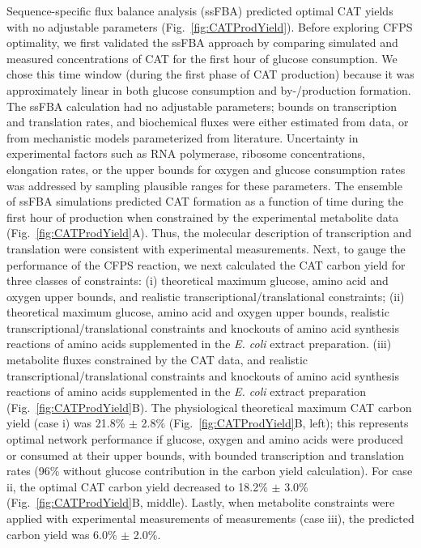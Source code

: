 \documentclass[12pt]{article}
\begin{document}
Sequence-specific flux balance analysis (ssFBA) predicted optimal CAT yields with no adjustable parameters (Fig.~\ref{fig:CATProdYield}).
Before exploring CFPS optimality, we first validated the ssFBA approach by comparing simulated and measured concentrations of CAT for the first hour of glucose consumption.
We chose this time window (during the first phase of CAT production) because it was approximately linear in both glucose consumption and by-/production formation.
The ssFBA calculation had no adjustable parameters; bounds on transcription and translation rates, and biochemical fluxes were either estimated from data, or
from mechanistic models parameterized from literature.
Uncertainty in experimental factors such as RNA polymerase, ribosome concentrations, elongation rates, or the upper bounds for oxygen and glucose consumption rates was addressed
by sampling plausible ranges for these parameters.
The ensemble of ssFBA simulations predicted CAT formation as a function of time during the first hour of production when constrained by the experimental metabolite data (Fig.~\ref{fig:CATProdYield}A).
Thus, the molecular description of transcription and translation were consistent with experimental measurements.
Next, to gauge the performance of the CFPS reaction, we next calculated the CAT carbon yield for three classes of constraints:
(i) theoretical maximum glucose, amino acid and oxygen upper bounds, and realistic transcriptional/translational constraints;
(ii) theoretical maximum glucose, amino acid and oxygen upper bounds, realistic transcriptional/translational constraints and knockouts of amino acid synthesis reactions of amino acids supplemented in the \textit{E. coli} extract preparation.  
(iii) metabolite fluxes constrained by the CAT data, and realistic transcriptional/translational constraints and knockouts of amino acid synthesis reactions of amino acids supplemented in the \textit{E. coli} extract preparation (Fig.~\ref{fig:CATProdYield}B).
The physiological theoretical maximum CAT carbon yield (case i) was 21.8\% $\pm$ 2.8\% (Fig.~\ref{fig:CATProdYield}B, left); this represents optimal network performance if glucose, oxygen and amino acids were produced or consumed at their upper bounds, with bounded transcription and translation rates (96\% without glucose contribution in the carbon yield calculation).
For case ii, the optimal CAT carbon yield decreased to 18.2\% $\pm$ 3.0\% (Fig.~\ref{fig:CATProdYield}B, middle).
Lastly, when metabolite constraints were applied with experimental measurements of measurements (case iii), the predicted carbon yield was 6.0\% $\pm$ 2.0\%.
\end{document}
